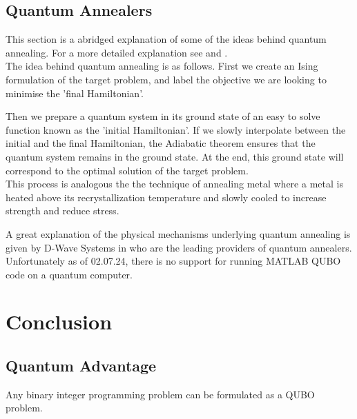 \documentclass{article}
\begin{document}
\subsection{Quantum Annealers}

\noindent This section is a abridged explanation of some of the ideas behind quantum annealing. For a more detailed explanation see \cite{tasseff2022emergingpotentialquantumannealing} and \cite{Yarkoni_2022}.\\

\noindent The idea behind quantum annealing is as follows. First we create an Ising formulation of the target problem, and label the objective we are looking to minimise the 'final Hamiltonian'.

\noindent Then we prepare a quantum system in its ground state of an easy to solve function known as the 'initial Hamiltonian'. If we slowly interpolate between the initial and the final Hamiltonian, the Adiabatic theorem \cite{Yarkoni_2022} ensures that the quantum system remains in the ground state. At the end, this ground state will correspond to the optimal solution of the target problem.\\

\noindent This process is analogous the the technique of annealing metal where a metal is heated above its recrystallization temperature and slowly cooled to increase strength and reduce stress.

\noindent A great explanation of the physical mechanisms underlying quantum annealing is given by D-Wave Systems in \cite{quantumAnnealingDWave} who are the leading providers of quantum annealers. \\

\noindent Unfortunately as of 02.07.24, there is no support for running MATLAB QUBO code on a quantum computer. 

\section{Conclusion}

\subsection{Quantum Advantage}



Any binary integer programming problem can be formulated as a QUBO problem. 

\nocite{*}
\printbibliography %
\end{document}
